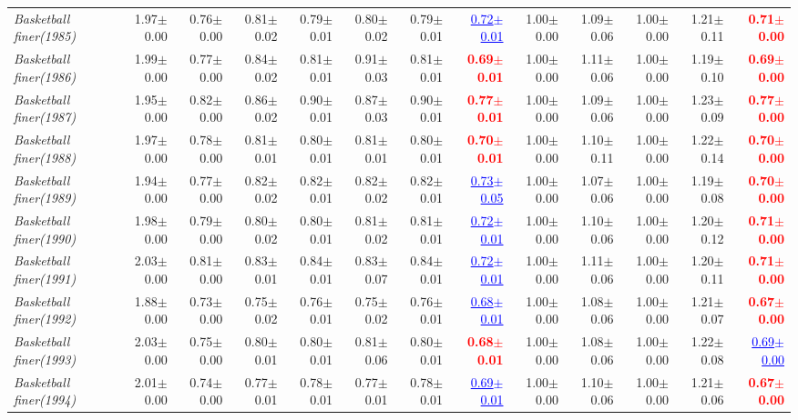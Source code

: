 \documentclass[nohyperref]{article}
\theoremstyle{plain}
\theoremstyle{definition}
\theoremstyle{remark}
\newcommand{\red}[1]{\textcolor{red}{\textbf{#1}}}
\newcommand{\blue}[1]{\textcolor{blue}{\underline{#1}}}
\begin{document}
\begin{table*}[!ht]
{\begin{tabular}{lrr|rrrrr|rrrrr}
			{\it Basketball finer(1985)} & 1.97$\pm$0.00 & 0.76$\pm$0.00 & 0.81$\pm$0.02 & 0.79$\pm$0.01 & 0.80$\pm$0.02 & 0.79$\pm$0.01 & \blue{0.72$\pm$0.01} & 1.00$\pm$0.00 & 1.09$\pm$0.06 & 1.00$\pm$0.00 & 1.21$\pm$0.11 & \red{0.71$\pm$0.00} \\
			{\it Basketball finer(1986)} & 1.99$\pm$0.00 & 0.77$\pm$0.00 & 0.84$\pm$0.02 & 0.81$\pm$0.01 & 0.91$\pm$0.03 & 0.81$\pm$0.01 & \red{0.69$\pm$0.01} & 1.00$\pm$0.00 & 1.11$\pm$0.06 & 1.00$\pm$0.00 & 1.19$\pm$0.10 & \red{0.69$\pm$0.00} \\
			{\it Basketball finer(1987)} & 1.95$\pm$0.00 & 0.82$\pm$0.00 & 0.86$\pm$0.02 & 0.90$\pm$0.01 & 0.87$\pm$0.03 & 0.90$\pm$0.01 & \red{0.77$\pm$0.01} & 1.00$\pm$0.00 & 1.09$\pm$0.06 & 1.00$\pm$0.00 & 1.23$\pm$0.09 & \red{0.77$\pm$0.00} \\
			{\it Basketball finer(1988)} & 1.97$\pm$0.00 & 0.78$\pm$0.00 & 0.81$\pm$0.01 & 0.80$\pm$0.01 & 0.81$\pm$0.01 & 0.80$\pm$0.01 & \red{0.70$\pm$0.01} & 1.00$\pm$0.00 & 1.10$\pm$0.11 & 1.00$\pm$0.00 & 1.22$\pm$0.14 & \red{0.70$\pm$0.00} \\
			{\it Basketball finer(1989)} & 1.94$\pm$0.00 & 0.77$\pm$0.00 & 0.82$\pm$0.02 & 0.82$\pm$0.01 & 0.82$\pm$0.02 & 0.82$\pm$0.01 & \blue{0.73$\pm$0.05} & 1.00$\pm$0.00 & 1.07$\pm$0.06 & 1.00$\pm$0.00 & 1.19$\pm$0.08 & \red{0.70$\pm$0.00} \\
			{\it Basketball finer(1990)} & 1.98$\pm$0.00 & 0.79$\pm$0.00 & 0.80$\pm$0.02 & 0.80$\pm$0.01 & 0.81$\pm$0.02 & 0.81$\pm$0.01 & \blue{0.72$\pm$0.01} & 1.00$\pm$0.00 & 1.10$\pm$0.06 & 1.00$\pm$0.00 & 1.20$\pm$0.12 & \red{0.71$\pm$0.00} \\
			{\it Basketball finer(1991)} & 2.03$\pm$0.00 & 0.81$\pm$0.00 & 0.83$\pm$0.01 & 0.84$\pm$0.01 & 0.83$\pm$0.07 & 0.84$\pm$0.01 & \blue{0.72$\pm$0.01} & 1.00$\pm$0.00 & 1.11$\pm$0.06 & 1.00$\pm$0.00 & 1.20$\pm$0.11 & \red{0.71$\pm$0.00} \\
			{\it Basketball finer(1992)} & 1.88$\pm$0.00 & 0.73$\pm$0.00 & 0.75$\pm$0.02 & 0.76$\pm$0.01 & 0.75$\pm$0.02 & 0.76$\pm$0.01 & \blue{0.68$\pm$0.01} & 1.00$\pm$0.00 & 1.08$\pm$0.06 & 1.00$\pm$0.00 & 1.21$\pm$0.07 & \red{0.67$\pm$0.00} \\
			{\it Basketball finer(1993)} & 2.03$\pm$0.00 & 0.75$\pm$0.00 & 0.80$\pm$0.01 & 0.80$\pm$0.01 & 0.81$\pm$0.06 & 0.80$\pm$0.01 & \red{0.68$\pm$0.01} & 1.00$\pm$0.00 & 1.08$\pm$0.06 & 1.00$\pm$0.00 & 1.22$\pm$0.08 & \blue{0.69$\pm$0.00} \\
			{\it Basketball finer(1994)} & 2.01$\pm$0.00 & 0.74$\pm$0.00 & 0.77$\pm$0.01 & 0.78$\pm$0.01 & 0.77$\pm$0.01 & 0.78$\pm$0.01 & \blue{0.69$\pm$0.01} & 1.00$\pm$0.00 & 1.10$\pm$0.06 & 1.00$\pm$0.00 & 1.21$\pm$0.06 & \red{0.67$\pm$0.00} \\

\end{tabular}}
\end{table*}
\end{document}
